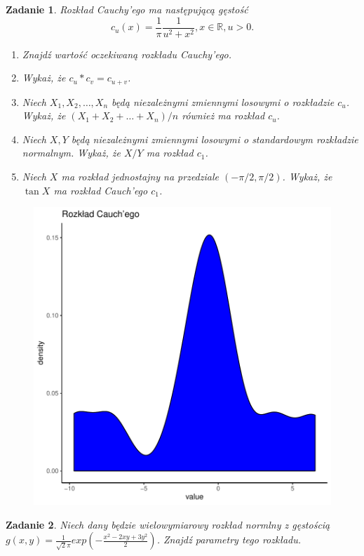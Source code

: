 \documentclass{mwart}
\newtheorem{zd}{Zadanie}
\begin{document}
\begin{zd}
Rozkład Cauchy'ego ma następującą gęstość
\begin{displaymath}
c_u(x) = \frac{1}{\pi}\frac{1}{u^2 + x^2}, x\in \mathbb{R}, u >0.
\end{displaymath}
\begin{enumerate}
\item Znajdź wartość oczekiwaną rozkładu Cauchy'ego.
\item Wykaż, że $c_u\ast c_v = c_{u+v}$.
\item Niech $X_1, X_2, \dots, X_n$ będą niezależnymi zmiennymi losowymi o rozkładzie $c_u$. Wykaż, że $(X_1+X_2+\dots +X_n)/n$ również ma rozkład $c_u$.
\item Niech $X, Y$ będą niezależnymi zmiennymi losowymi o standardowym rozkładzie normalnym. Wykaż, że $X/Y$ ma rozkład $c_1$.
\item Niech $X$ ma rozkład jednostajny na przedziale $(-\pi/2, \pi/2)$. Wykaż, że $\tan X$ ma rozkład Cauch'ego $c_1$.
\end{enumerate}
\begin{figure}
\includegraphics{Zestaw1_PS_2020-002}
\end{figure}
\end{zd}

\begin{zd}
Niech dany będzie wielowymiarowy rozkład normlny z gęstością $g(x,y)=\frac{1}{\sqrt{2}\pi}exp\left(-\frac{x^{2}-2xy+3y^{2}}{2}\right)$. Znajdź parametry tego rozkładu.
\end{zd}
\end{document}
